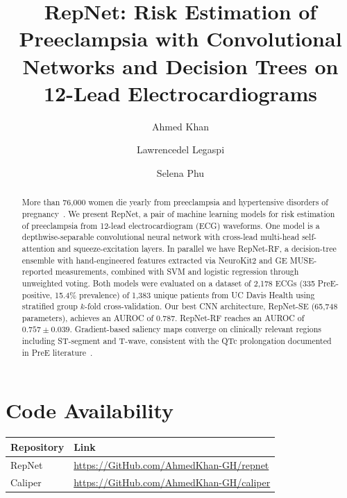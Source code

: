 \documentclass[sigconf,nonacm]{acmart}
\begin{document}
\title{RepNet: Risk Estimation of Preeclampsia with Convolutional Networks and Decision Trees on 12-Lead Electrocardiograms}

\author{Ahmed Khan}

\author{Lawrencedel Legaspi}

\author{Selena Phu}

\begin{abstract}
  More than 76,000 women die yearly from preeclampsia and hypertensive disorders of pregnancy~\cite{butler_ai-based_2024}. We present RepNet, a pair of machine learning models for risk estimation of preeclampsia from 12-lead electrocardiogram (ECG) waveforms. One model is a depthwise-separable convolutional neural network with cross-lead multi-head self-attention and squeeze-excitation layers. In parallel we have RepNet-RF, a decision-tree ensemble with hand-engineered features extracted via NeuroKit2 and GE MUSE-reported measurements, combined with SVM and logistic regression through unweighted voting. Both models were evaluated on a dataset of 2,178 ECGs (335 PreE-positive, 15.4\% prevalence) of 1,383 unique patients from UC Davis Health using stratified group $k$-fold cross-validation. Our best CNN architecture, RepNet-SE (65,748 parameters), achieves an AUROC of 0.787. RepNet-RF reaches an AUROC of $0.757 \pm 0.039$. Gradient-based saliency maps converge on clinically relevant regions including ST-segment and T-wave, consistent with the QTc prolongation documented in PreE literature~\cite{aboshady_qtc_2025, angeli_novel_2015}.
\end{abstract}

\maketitle

{%
\renewcommand{\contentsname}{Table of Contents}
\setcounter{tocdepth}{2}
}

\section*{Code Availability}
\begin{center}
\begin{tabular}{@{}ll@{}}
\toprule
\textbf{Repository} & \textbf{Link} \\
\midrule
RepNet & \url{https://GitHub.com/AhmedKhan-GH/repnet} \\
Caliper & \url{https://GitHub.com/AhmedKhan-GH/caliper} \\
\bottomrule
\end{tabular}
\end{center}
\end{document}
